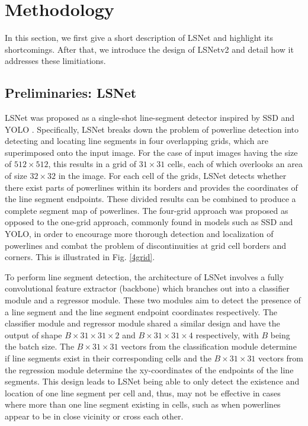 \documentclass[journal]{IEEEtran}
\begin{document}
\section{Methodology}

In this section, we first give a short description of LSNet and highlight its shortcomings. After that, we introduce the design of LSNetv2 and detail how it addresses these limitiations.

\subsection{Preliminaries: LSNet}
LSNet \cite{Nguyen2020} was proposed as a single-shot line-segment detector inspired by SSD \cite{SSD} and YOLO \cite{YOLO}. Specifically, LSNet breaks down the problem of powerline detection into detecting and locating line segments in four overlapping grids, which are superimposed onto the input image. For the case of input images having the size of $512 \times 512$, this results in a grid of $31 \times 31$ cells, each of which overlooks an area of size $32 \times 32$ in the image. For each cell of the grids,  LSNet detects whether there exist parts of powerlines within its borders and provides the coordinates of the line segment endpoints. These divided results can be combined to produce a complete segment map of powerlines. The four-grid approach was proposed as opposed to the one-grid approach, commonly found in models such as SSD and YOLO, in order to encourage more thorough detection and localization of powerlines and combat the problem of discontinuities at grid cell borders and corners. This is illustrated in Fig. \ref{4grid}. 

To perform line segment detection, the architecture of LSNet involves a fully convolutional feature extractor (backbone) which branches out into a classifier module and a regressor module. These two modules aim to detect the presence of a line segment and the line segment endpoint coordinates respectively. The classifier module and regressor module shared a similar design and have the output of shape $B \times 31 \times 31 \times 2$ and $B \times 31 \times 31 \times 4$ respectively, with $B$ being the batch size. The $B \times 31 \times 31$ vectors from the classification module determine if line segments exist in their corresponding cells and the $B \times 31 \times 31$ vectors from the regression module determine the xy-coordinates of the endpoints of the line segments. This design leads to LSNet being able to only detect the existence and location of one line segment per cell and, thus, may not be effective in cases where more than one line segment existing in cells, such as when powerlines appear to be in close vicinity or cross each other. 
\end{document}
